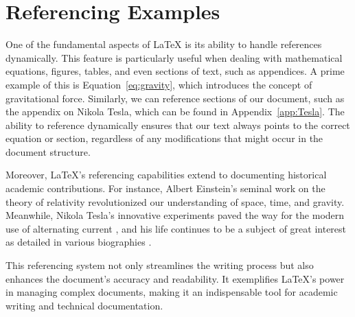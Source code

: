 \section{Referencing Examples}

One of the fundamental aspects of LaTeX is its ability to handle references dynamically. This feature is particularly useful when dealing with mathematical equations, figures, tables, and even sections of text, such as appendices. A prime example of this is Equation~\ref{eq:gravity}, which introduces the concept of gravitational force. Similarly, we can reference sections of our document, such as the appendix on Nikola Tesla, which can be found in Appendix~\ref{app:Tesla}. The ability to reference dynamically ensures that our text always points to the correct equation or section, regardless of any modifications that might occur in the document structure.

Moreover, LaTeX's referencing capabilities extend to documenting historical academic contributions. For instance, Albert Einstein's seminal work on the theory of relativity \cite{einstein_relativity} revolutionized our understanding of space, time, and gravity. Meanwhile, Nikola Tesla's innovative experiments paved the way for the modern use of alternating current \cite{tesla_transmission}, and his life continues to be a subject of great interest as detailed in various biographies \cite{tesla_biography}. 

This referencing system not only streamlines the writing process but also enhances the document's accuracy and readability. It exemplifies LaTeX's power in managing complex documents, making it an indispensable tool for academic writing and technical documentation.

